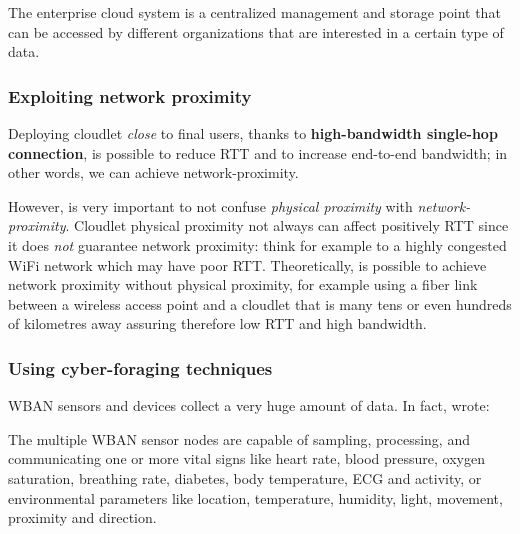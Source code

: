 \documentclass[sigchi]{acmart}
\begin{document}
\vspace{0.3cm}

\begin{quoting}[font=itshape, begintext={``}, endtext={''\cite[par.~4.1]{MSAReport}}] 
The enterprise cloud system is a centralized management and storage point that can be accessed by different organizations that are interested in a certain type of data. 
\end{quoting}

\vspace{0.3cm}

\subsubsection{Exploiting network proximity}

Deploying cloudlet \textit{close} to final users, thanks to \textbf{high-bandwidth single-hop connection}, is possible to reduce RTT and to increase end-to-end bandwidth; in other words, we can achieve network-proximity.\citep{TheSeminalRoleEdgeNativeApplications}

However, is very important to not confuse \textit{physical proximity} with \textit{network-proximity}. Cloudlet physical proximity not always can affect positively RTT since it does \textit{not} guarantee network proximity: think for example to a highly congested WiFi network which may have poor RTT. Theoretically, is possible to achieve network proximity without physical proximity, for example using a fiber link between a wireless access point and a cloudlet that is many tens or even hundreds of kilometres away assuring therefore low RTT and high bandwidth.\cite{TheSeminalRoleEdgeNativeApplications}

\subsubsection{Using cyber-foraging techniques}

WBAN sensors and devices collect a very huge amount of data. In fact, \citet{MSAReport} wrote:

\vspace{0.3cm}

\begin{quoting}[font=itshape, begintext={``}, endtext={''\cite[par.~1.1]{MSAReport}}]
The multiple WBAN sensor nodes are capable of sampling, processing, and communicating one or more vital signs like heart rate, blood pressure, oxygen saturation, breathing rate, diabetes, body temperature, ECG and activity, or environmental parameters like location, temperature, humidity, light, movement, proximity and direction. 
\end{quoting}
\end{document}
